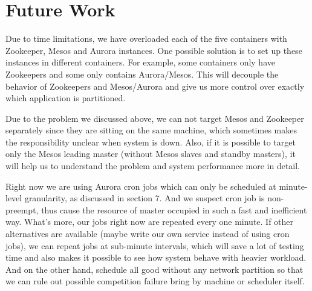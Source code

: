 \documentclass[letterpaper,twocolumn,10pt]{article}
\begin{document}
\section{Future Work}
Due to time limitations, we have overloaded each of the five containers with Zookeeper, Mesos and Aurora instances. One possible solution is to set up these instances in different containers. For example, some containers only have Zookeepers and some only contains Aurora/Mesos. This will decouple the behavior of Zookeepers and Mesos/Aurora and give us more control over exactly which application is partitioned.

Due to the problem we discussed above, we can not target Mesos and Zookeeper separately since they are sitting on the same machine, which sometimes makes the responsibility unclear when system is down. Also, if it is possible to target only the Mesos leading master (without Mesos slaves and standby masters), it will help us to understand the problem and system performance more in detail.

Right now we are using Aurora cron jobs which can only be scheduled at minute-level granularity, as discussed in section 7. And we suspect cron job is non-preempt, thus cause the resource of master occupied in such a fast and inefficient way. What's more, our jobs right now are repeated every one minute. If other alternatives are available (maybe write our own service instead of using cron jobs), we can repeat jobs at sub-minute intervals, which will save a lot of testing time and also makes it possible to see how system behave with heavier workload. And on the other hand, schedule all good without any network partition so that we can rule out possible competition failure bring by machine or scheduler itself.

{\footnotesize 
}
\end{document}
